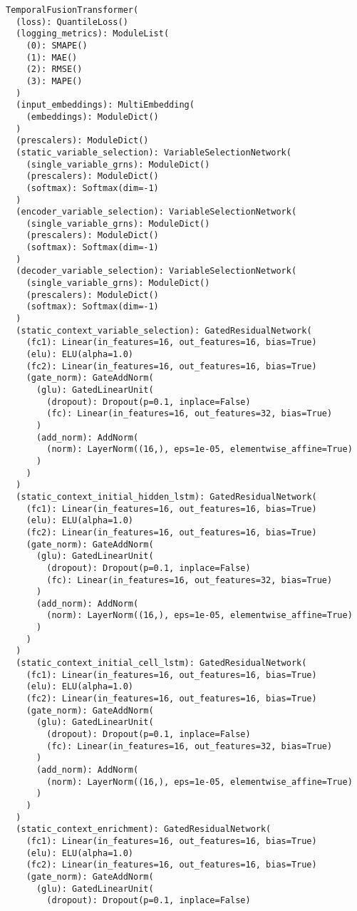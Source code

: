 \documentclass{article}
\begin{document}
\begin{lstlisting}
TemporalFusionTransformer(
  (loss): QuantileLoss()
  (logging_metrics): ModuleList(
    (0): SMAPE()
    (1): MAE()
    (2): RMSE()
    (3): MAPE()
  )
  (input_embeddings): MultiEmbedding(
    (embeddings): ModuleDict()
  )
  (prescalers): ModuleDict()
  (static_variable_selection): VariableSelectionNetwork(
    (single_variable_grns): ModuleDict()
    (prescalers): ModuleDict()
    (softmax): Softmax(dim=-1)
  )
  (encoder_variable_selection): VariableSelectionNetwork(
    (single_variable_grns): ModuleDict()
    (prescalers): ModuleDict()
    (softmax): Softmax(dim=-1)
  )
  (decoder_variable_selection): VariableSelectionNetwork(
    (single_variable_grns): ModuleDict()
    (prescalers): ModuleDict()
    (softmax): Softmax(dim=-1)
  )
  (static_context_variable_selection): GatedResidualNetwork(
    (fc1): Linear(in_features=16, out_features=16, bias=True)
    (elu): ELU(alpha=1.0)
    (fc2): Linear(in_features=16, out_features=16, bias=True)
    (gate_norm): GateAddNorm(
      (glu): GatedLinearUnit(
        (dropout): Dropout(p=0.1, inplace=False)
        (fc): Linear(in_features=16, out_features=32, bias=True)
      )
      (add_norm): AddNorm(
        (norm): LayerNorm((16,), eps=1e-05, elementwise_affine=True)
      )
    )
  )
  (static_context_initial_hidden_lstm): GatedResidualNetwork(
    (fc1): Linear(in_features=16, out_features=16, bias=True)
    (elu): ELU(alpha=1.0)
    (fc2): Linear(in_features=16, out_features=16, bias=True)
    (gate_norm): GateAddNorm(
      (glu): GatedLinearUnit(
        (dropout): Dropout(p=0.1, inplace=False)
        (fc): Linear(in_features=16, out_features=32, bias=True)
      )
      (add_norm): AddNorm(
        (norm): LayerNorm((16,), eps=1e-05, elementwise_affine=True)
      )
    )
  )
  (static_context_initial_cell_lstm): GatedResidualNetwork(
    (fc1): Linear(in_features=16, out_features=16, bias=True)
    (elu): ELU(alpha=1.0)
    (fc2): Linear(in_features=16, out_features=16, bias=True)
    (gate_norm): GateAddNorm(
      (glu): GatedLinearUnit(
        (dropout): Dropout(p=0.1, inplace=False)
        (fc): Linear(in_features=16, out_features=32, bias=True)
      )
      (add_norm): AddNorm(
        (norm): LayerNorm((16,), eps=1e-05, elementwise_affine=True)
      )
    )
  )
  (static_context_enrichment): GatedResidualNetwork(
    (fc1): Linear(in_features=16, out_features=16, bias=True)
    (elu): ELU(alpha=1.0)
    (fc2): Linear(in_features=16, out_features=16, bias=True)
    (gate_norm): GateAddNorm(
      (glu): GatedLinearUnit(
        (dropout): Dropout(p=0.1, inplace=False)

\end{lstlisting}
\end{document}
